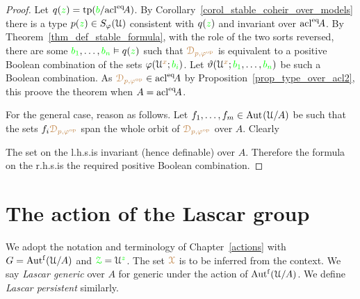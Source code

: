 \begin{proof}
  Let $q({\color{green} z})={\rm tp}({\color{green} b}/{\rm acl}^{{\rm eq}}\!A)$.
  By Corollary~\ref{corol_stable_coheir_over_models} there is a type $p({\color{green} z})\in S_\varphi(\EuScript U)$ consistent with $q({\color{green} z})$ and invariant over ${\rm acl}^{{\rm eq}}\!A$.
  By Theorem~\ref{thm_def_stable_formula}, with the role of the two sorts reversed, there are some ${\color{green} b_1},\dots,{\color{green} b_n}\vDash q({\color{green} z})$ such that ${\color{brown}\EuScript D_{p,\varphi^{\rm op}}}$ is equivalent to a positive Boolean combination of the sets $\varphi(\EuScript U^{\color{brown} x};{\color{green} b_i})$.
  Let $\vartheta(\EuScript U^{\color{brown} x};{\color{green} b_1},\dots,{\color{green} b_n})$ be such a Boolean combination.
  As ${\color{brown}\EuScript D_{p,\varphi^{\rm op}}}\in{\rm acl}^{{\rm eq}}\!A$ by Proposition~\ref{prop_type_over_acl2}, this proove the theorem when $A={\rm acl}^{{\rm eq}}\!A$.

  For the general case, reason as follows.
  Let $f_1,\dots,f_m\in{\rm Aut\kern.15ex}(\EuScript U/A)$ be such that the sets $f_i{\color{brown}\EuScript D_{p,\varphi^{\rm op}}}$ span the whole orbit of ${\color{brown}\EuScript D_{p,\varphi^{\rm op}}}$ over $A$.
  Clearly


  The set on the l.h.s.\@ is invariant (hence definable) over $A$.
  Therefore the formula on the r.h.s.\@ is the required positive Boolean combination.
\end{proof}

\section{The action of the Lascar group}

\def\medrel#1{\parbox[t]{6ex}{$\displaystyle\hfil #1$}}
\def\ceq#1#2#3{\parbox{10ex}{$\displaystyle #1$}\medrel{#2}$\displaystyle  #3$}

We adopt the notation and terminology of Chapter~\ref{actions} with $G=\mbox{Aut$^{\rm f}$}(\EuScript U/A)$ and ${\color{green}\EuScript Z}=\EuScript U^{\color{green} z}$.
The set ${\color{brown}\EuScript X}$ is to be inferred from the context.
We say \emph{Lascar generic\/} over $A$ for generic under the action of $\mbox{Aut$^{\rm f}$}(\EuScript U/A)$.
We define \emph{Lascar persistent\/} similarly.

